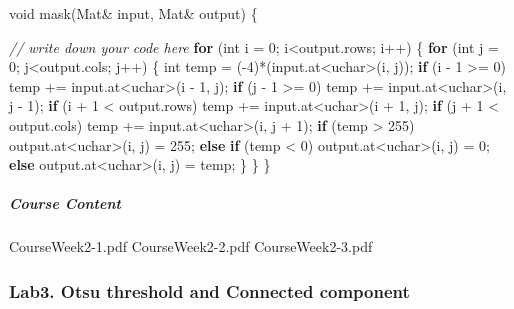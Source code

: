\documentclass[]{article}
\newenvironment{Shaded}{\begin{snugshade}}{\end{snugshade}}
\newcommand{\KeywordTok}[1]{\textcolor[rgb]{0.13,0.29,0.53}{\textbf{{#1}}}}
\newcommand{\DataTypeTok}[1]{\textcolor[rgb]{0.13,0.29,0.53}{{#1}}}
\newcommand{\DecValTok}[1]{\textcolor[rgb]{0.00,0.00,0.81}{{#1}}}
\newcommand{\CommentTok}[1]{\textcolor[rgb]{0.56,0.35,0.01}{\textit{{#1}}}}
\newcommand{\NormalTok}[1]{{#1}}
\let\oldsubparagraph\subparagraph
\renewcommand{\subparagraph}[1]{\oldsubparagraph{#1}\mbox{}}
\begin{document}
\begin{Shaded}
\begin{Highlighting}[]
\DataTypeTok{void}  \NormalTok{mask(Mat& input, Mat& output) \{}

    \CommentTok{// write down your code here}
    \KeywordTok{for} \NormalTok{(}\DataTypeTok{int} \NormalTok{i = }\DecValTok{0}\NormalTok{; i<output.rows; i++) \{}
        \KeywordTok{for} \NormalTok{(}\DataTypeTok{int} \NormalTok{j = }\DecValTok{0}\NormalTok{; j<output.cols; j++) \{}
            \DataTypeTok{int} \NormalTok{temp = (}\DecValTok{-4}\NormalTok{)*(input.at<}\DataTypeTok{uchar}\NormalTok{>(i, j));}
            \KeywordTok{if} \NormalTok{(i - }\DecValTok{1} \NormalTok{>= }\DecValTok{0}\NormalTok{)}
                \NormalTok{temp += input.at<}\DataTypeTok{uchar}\NormalTok{>(i - }\DecValTok{1}\NormalTok{, j);}
            \KeywordTok{if} \NormalTok{(j - }\DecValTok{1} \NormalTok{>= }\DecValTok{0}\NormalTok{)}
                \NormalTok{temp += input.at<}\DataTypeTok{uchar}\NormalTok{>(i, j - }\DecValTok{1}\NormalTok{);}
            \KeywordTok{if} \NormalTok{(i + }\DecValTok{1} \NormalTok{< output.rows)}
                \NormalTok{temp += input.at<}\DataTypeTok{uchar}\NormalTok{>(i + }\DecValTok{1}\NormalTok{, j);}
            \KeywordTok{if} \NormalTok{(j + }\DecValTok{1} \NormalTok{< output.cols)}
                \NormalTok{temp += input.at<}\DataTypeTok{uchar}\NormalTok{>(i, j + }\DecValTok{1}\NormalTok{);}
            \KeywordTok{if} \NormalTok{(temp > }\DecValTok{255}\NormalTok{)}
                \NormalTok{output.at<}\DataTypeTok{uchar}\NormalTok{>(i, j) = }\DecValTok{255}\NormalTok{;}
            \KeywordTok{else} \KeywordTok{if} \NormalTok{(temp < }\DecValTok{0}\NormalTok{)}
                \NormalTok{output.at<}\DataTypeTok{uchar}\NormalTok{>(i, j) = }\DecValTok{0}\NormalTok{;}
            \KeywordTok{else}
                \NormalTok{output.at<}\DataTypeTok{uchar}\NormalTok{>(i, j) = temp;}
        \NormalTok{\}}
    \NormalTok{\}}
\NormalTok{\}}
\end{Highlighting}
\end{Shaded}

\subparagraph{Course Content}\label{course-content-1}

CourseWeek2-1.pdf CourseWeek2-2.pdf CourseWeek2-3.pdf

\subsubsection{Lab3. Otsu threshold and Connected
component}\label{lab3.-otsu-threshold-and-connected-component}
\end{document}
